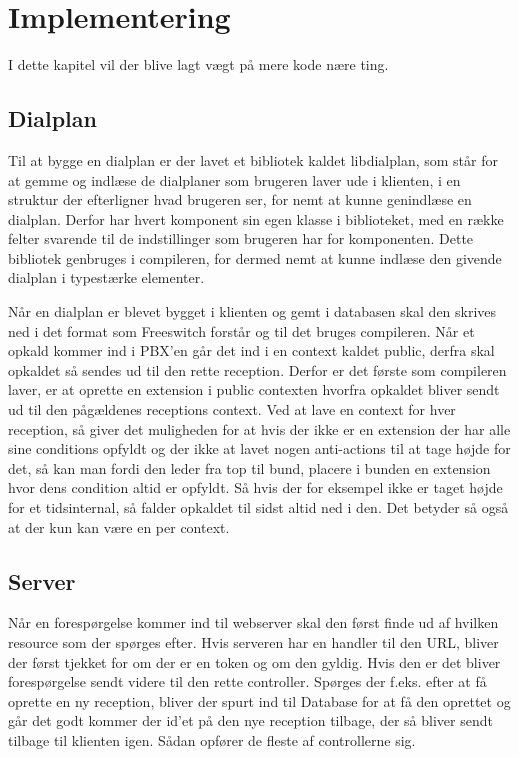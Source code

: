 \chapter{Implementering}

I dette kapitel vil der blive lagt vægt på mere kode nære ting.



\section{Dialplan}

Til at bygge en dialplan er der lavet et bibliotek kaldet libdialplan, som står for at gemme og indlæse de dialplaner som brugeren laver ude i klienten, i en struktur der efterligner hvad brugeren ser, for nemt at kunne genindlæse en dialplan. Derfor har hvert komponent sin egen klasse i biblioteket, med en række felter svarende til de indstillinger som brugeren har for komponenten. Dette bibliotek genbruges i compileren, for dermed nemt at kunne indlæse den givende dialplan i typestærke elementer.


Når en dialplan er blevet bygget i klienten og gemt i databasen skal den skrives ned i det format som Freeswitch forstår og til det bruges compileren. Når et opkald kommer ind i PBX'en går det ind i en context kaldet public, derfra skal opkaldet så sendes ud til den rette reception. Derfor er det første som compileren laver, er at oprette en extension i public contexten hvorfra opkaldet bliver sendt ud til den pågældenes receptions context.
Ved at lave en context for hver reception, så giver det muligheden for at hvis der ikke er en extension der har alle sine conditions opfyldt og der ikke at lavet nogen anti-actions til at tage højde for det, så kan man fordi den leder fra top til bund, placere i bunden en extension hvor dens condition altid er opfyldt. Så hvis der for eksempel ikke er taget højde for et tidsinternal, så falder opkaldet til sidst altid ned i den. Det betyder så også at der kun kan være en per context.

\section{Server}

Når en forespørgelse kommer ind til webserver skal den først finde ud af hvilken resource som der spørges efter. Hvis serveren har en handler til den URL, bliver der først tjekket for om der er en token og om den gyldig. Hvis den er det bliver forespørgelse sendt videre til den rette controller. Spørges der f.eks. efter at få oprette en ny reception, bliver der spurt ind til Database for at få den oprettet og går det godt kommer der id'et på den nye reception tilbage, der så bliver sendt tilbage til klienten igen. 
Sådan opfører de fleste af controllerne sig.

